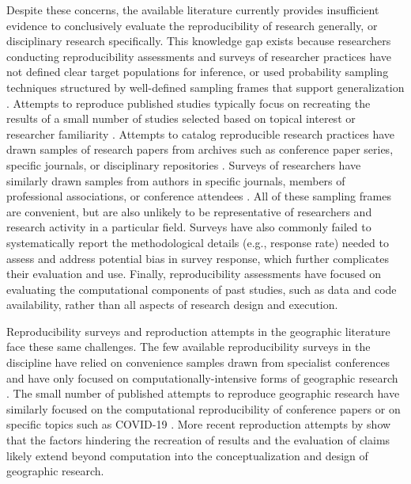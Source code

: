 \documentclass[]{interact}
\newcommand{\citep}{\parencite}
\theoremstyle{plain}%
\theoremstyle{definition}
\theoremstyle{remark}
\begin{document}
Despite these concerns, the available literature currently provides insufficient evidence to conclusively evaluate the reproducibility of research generally, or disciplinary research specifically.
This knowledge gap exists because researchers conducting reproducibility assessments and surveys of researcher practices have not defined clear target populations for inference, or used probability sampling techniques structured by well-defined sampling frames that support generalization \citep{NASEM2019}.
Attempts to reproduce published studies typically focus on recreating the results of a small number of studies selected based on topical interest or researcher familiarity \citep{camerer2016evaluating, camerer2018evaluating, open2015estimating}. 
Attempts to catalog reproducible research practices have drawn samples of research papers from archives such as conference paper series, specific journals, or disciplinary repositories \citep{byrne_2017, gundersen2018state, stodden2016enhancing, stodden2018enabling}.
Surveys of researchers have similarly drawn samples from authors in specific journals, members of professional associations, or conference attendees \citep{baker20161}.
All of these sampling frames are convenient, but are also unlikely to be representative of researchers and research activity in a particular field. 
Surveys have also commonly failed to systematically report the methodological details (e.g., response rate) needed to assess and address potential bias in survey response, which further complicates their evaluation and use. 
Finally, reproducibility assessments have focused on evaluating the computational components of past studies, such as data and code availability, rather than all aspects of research design and execution.

Reproducibility surveys and reproduction attempts in the geographic literature face these same challenges. 
The few available reproducibility surveys in the discipline have relied on convenience samples drawn from specialist conferences and have only focused on computationally-intensive forms of geographic research \citep{balz2020reproducibility, konkol2019, ostermann2017}. 
The small number of published attempts to reproduce geographic research have similarly focused on the computational reproducibility of conference papers \citep{Nust-AGILE_2018, Nust_AGILE_2020, Nust_AGILE_2021, Nust_AGILE_2022, ostermann2021} or on specific topics such as COVID-19 \citep{Holler2023disability, Kedron2022dimaggio, Kedron2023Beyond, paez2022reproducibility}. 
More recent reproduction attempts by \textcite{Kedron2023Beyond} show that the factors hindering the recreation of results and the evaluation of claims likely extend beyond computation into the conceptualization and design of geographic research.
\end{document}
